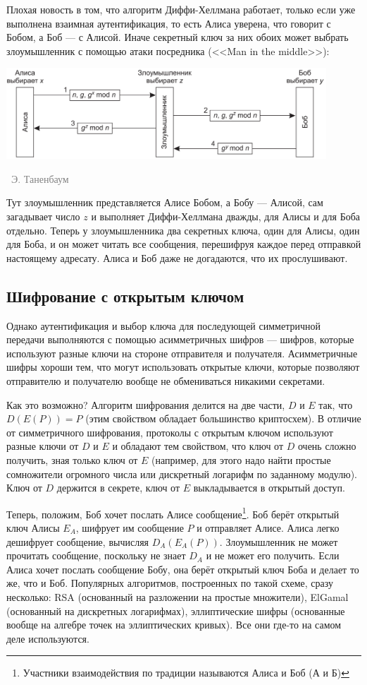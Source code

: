 \documentclass[a5paper]{article}
\newcommand{\attribution}[1] {
\vspace{-5mm}\begin{flushright}\begin{scriptsize}\textcolor{gray}{\textcopyright\, #1}\end{scriptsize}\end{flushright}
}
\begin{document}
Плохая новость в том, что алгоритм Диффи-Хеллмана работает, только если уже выполнена взаимная аутентификация, то есть Алиса уверена, что говорит с Бобом, а Боб --- с Алисой. Иначе секретный ключ за них обоих может выбрать злоумышленник с помощью атаки посредника (<<Man in the middle>>):

\begin{center}
    \includegraphics[width=0.9\textwidth]{diffieHellmanMitm.png}
    \attribution{Э. Таненбаум}
\end{center}

Тут злоумышленник представляется Алисе Бобом, а Бобу --- Алисой, сам загадывает число $z$ и выполняет Диффи-Хеллмана дважды, для Алисы и для Боба отдельно. Теперь у злоумышленника два секретных ключа, один для Алисы, один для Боба, и он может читать все сообщения, перешифруя каждое перед отправкой настоящему адресату. Алиса и Боб даже не догадаются, что их прослушивают.

\subsection{Шифрование с открытым ключом}

Однако аутентификация и выбор ключа для последующей симметричной передачи выполняются с помощью асимметричных шифров --- шифров, которые используют разные ключи на стороне отправителя и получателя. Асимметричные шифры хороши тем, что могут использовать открытые ключи, которые позволяют отправителю и получателю вообще не обмениваться никакими секретами. 

Как это возможно? Алгоритм шифрования делится на две части, $D$ и $E$ так, что $D(E(P)) = P$ (этим свойством обладает большинство криптосхем). В отличие от симметричного шифрования, протоколы с открытым ключом используют разные ключи от $D$ и $E$ и обладают тем свойством, что ключ от $D$ очень сложно получить, зная только ключ от $E$ (например, для этого надо найти простые сомножители огромного числа или дискретный логарифм по заданному модулю). Ключ от $D$ держится в секрете, ключ от $E$ выкладывается в открытый доступ.

Теперь, положим, Боб хочет послать Алисе сообщение\footnote{Участники взаимодействия по традиции называются Алиса и Боб (А и Б)}. Боб берёт открытый ключ Алисы $E_A$, шифрует им сообщение $P$ и отправляет Алисе. Алиса легко дешифрует сообщение, вычисляя $D_A(E_A(P))$. Злоумышленник не может прочитать сообщение, поскольку не знает $D_A$ и не может его получить. Если Алиса хочет послать сообщение Бобу, она берёт открытый ключ Боба и делает то же, что и Боб. Популярных алгоритмов, построенных по такой схеме, сразу несколько: RSA (основанный на разложении на простые множители), ElGamal (основанный на дискретных логарифмах), эллиптические шифры (основанные вообще на алгебре точек на эллиптических кривых). Все они где-то на самом деле используются.
\end{document}
